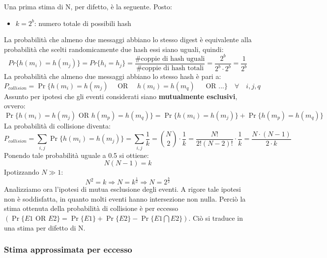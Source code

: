 Una prima stima di N, per difetto, è la seguente. Posto:
\begin{itemize}
	\item $k = 2^{b}$: numero totale di possibili hash
\end{itemize}
La probabilità che almeno due messaggi abbiano lo stesso digest è equivalente alla probabilità che scelti randomicamente due hash essi siano uguali, quindi:
\[
Pr\{h(m_i)=h(m_j)\} = Pr\{h_i = h_j\} = \frac{\text{\#coppie di hash uguali}}{\text{\#coppie di hash totali}} = \frac{2^b}{2^b \cdot 2^b} = \frac{1}{2^b}
\]
La probabilità che almeno due messaggi abbiano lo stesso hash è pari a:
\begin{equation}
P_{collision} = \Pr\{h(m_i) = h(m_j) \quad \mbox{ OR } \quad h(m_i) = h(m_q)\ \quad \mbox{ OR } ... \}  \quad \forall \quad i,j,q
\end{equation}
Assunto per ipotesi che gli eventi considerati siano \textbf{mutualmente esclusivi}, ovvero:
\begin{equation}
\Pr\{h(m_i) = h(m_j) \mbox{ OR } h(m_p) = h(m_q)\} = \Pr\{h(m_i) = h(m_j)\} + \Pr\{ h(m_p) = h(m_q)\}
\end{equation}
La probabilità di collisione diventa:
\begin{equation}
P_{collision} = \sum\limits_{i,j} \Pr\{h(m_i) = h(m_j)\} = \sum\limits_{i,j} \frac{1}{k} =  \binom {N}{2} \cdot \frac{1}{k} = \frac{N!}{2!(N - 2)!} \cdot \frac{1}{k} = \frac{N \cdot (N-1)}{2 \cdot k}
\end{equation}
Ponendo tale probabilità uguale a 0.5 si ottiene:
\begin{equation}
N(N - 1) = k
\end{equation}
Ipotizzando $N \gg 1$:
\begin{equation}
N^2 = k \Rightarrow N = k^{\frac{1}{2}} \Rightarrow N = 2^{\frac{b}{2}}
\end{equation}
Analizziamo ora l'ipotesi di mutua esclusione degli eventi. A rigore tale ipotesi non è soddisfatta, in quanto molti eventi hanno intersezione non nulla. Perciò la stima ottenuta della probabilità di collisione è per eccesso $(\Pr\{E1 \mbox{ OR } E2\} = \Pr\{E1\} + \Pr\{E2\} - \Pr\{E1 \bigcap E2\})$. Ciò si traduce in una stima per difetto di N. \newline \newline

\subsubsection{Stima approssimata per eccesso}

